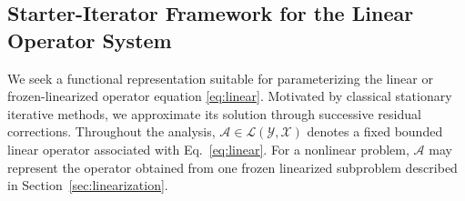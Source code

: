 \documentclass[preprint,numbers,sort&compress]{elsarticle}
\begin{document}
		
		
		
		
		
		\subsection{Starter-Iterator Framework for the Linear Operator System}
		
		We seek a functional representation suitable for parameterizing the linear or frozen-linearized operator equation \eqref{eq:linear}. Motivated by classical stationary iterative methods, we approximate its solution through
		successive residual corrections. Throughout the analysis, $\mathcal A\in\mathcal L(\mathcal Y,\mathcal X)$ denotes a fixed bounded linear operator associated with Eq.~\eqref{eq:linear}. For a nonlinear problem, $\mathcal A$ may represent the operator obtained from one frozen linearized subproblem described in
		Section~\ref{sec:linearization}.
		
\end{document}
